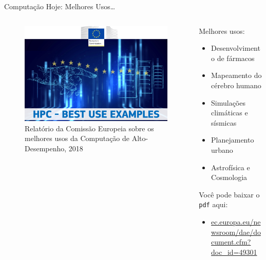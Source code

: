 \documentclass[10pt, compress, aspectratio=169, xcolor={table,usenames,dvipsnames}]{beamer}
\begin{document}
\begin{frame}[label={sec:org56b1634},fragile]{Computação Hoje: Melhores Usos\dots{}}
 \begin{columns}
\begin{column}{0.5\columnwidth}
\begin{figure}[htbp]
\centering
\includegraphics[width=\columnwidth]{../../../img/hpc_european_commission.png}
\caption{Relatório da \alert{Comissão Europeia} sobre os melhores usos da \alert{Computação de Alto-Desempenho}, 2018}
\end{figure}
\end{column}
\begin{column}{0.5\columnwidth}
\alert{Melhores} usos:
\begin{itemize}
\item Desenvolvimento de \alert{fármacos}
\item Mapeamento do \alert{cérebro humano}
\item Simulações \alert{climáticas} e \alert{sísmicas}
\item \alert{Planejamento urbano}
\item \alert{Astrofísica} e \alert{Cosmologia}
\end{itemize}

Você pode baixar o \texttt{pdf} aqui:
\begin{itemize}
\item \scriptsize\href{http://ec.europa.eu/newsroom/dae/document.cfm?doc_id=49301}{ec.europa.eu/newsroom/dae/document.cfm?doc\_id=49301}
\end{itemize}
\end{column}
\end{columns}
\end{frame}
\end{document}
